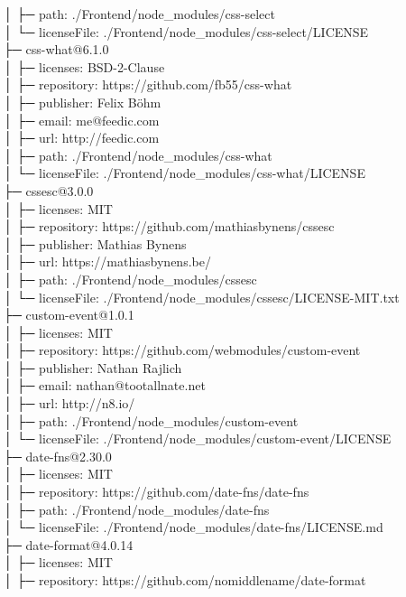 │  ├─ path: ./Frontend/node\_modules/css-select\\
│  └─ licenseFile: ./Frontend/node\_modules/css-select/LICENSE\\
├─ css-what@6.1.0\\
│  ├─ licenses: BSD-2-Clause\\
│  ├─ repository: https://github.com/fb55/css-what\\
│  ├─ publisher: Felix Böhm\\
│  ├─ email: me@feedic.com\\
│  ├─ url: http://feedic.com\\
│  ├─ path: ./Frontend/node\_modules/css-what\\
│  └─ licenseFile: ./Frontend/node\_modules/css-what/LICENSE\\
├─ cssesc@3.0.0\\
│  ├─ licenses: MIT\\
│  ├─ repository: https://github.com/mathiasbynens/cssesc\\
│  ├─ publisher: Mathias Bynens\\
│  ├─ url: https://mathiasbynens.be/\\
│  ├─ path: ./Frontend/node\_modules/cssesc\\
│  └─ licenseFile: ./Frontend/node\_modules/cssesc/LICENSE-MIT.txt\\
├─ custom-event@1.0.1\\
│  ├─ licenses: MIT\\
│  ├─ repository: https://github.com/webmodules/custom-event\\
│  ├─ publisher: Nathan Rajlich\\
│  ├─ email: nathan@tootallnate.net\\
│  ├─ url: http://n8.io/\\
│  ├─ path: ./Frontend/node\_modules/custom-event\\
│  └─ licenseFile: ./Frontend/node\_modules/custom-event/LICENSE\\
├─ date-fns@2.30.0\\
│  ├─ licenses: MIT\\
│  ├─ repository: https://github.com/date-fns/date-fns\\
│  ├─ path: ./Frontend/node\_modules/date-fns\\
│  └─ licenseFile: ./Frontend/node\_modules/date-fns/LICENSE.md\\
├─ date-format@4.0.14\\
│  ├─ licenses: MIT\\
│  ├─ repository: https://github.com/nomiddlename/date-format\\
